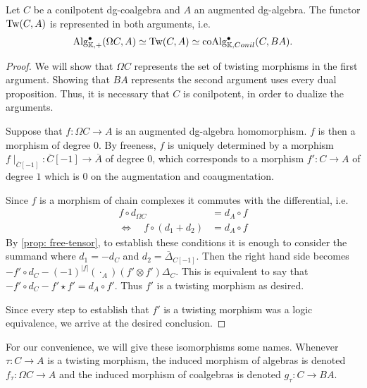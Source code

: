 \documentclass[../thesis.tex]{subfiles}
\begin{document}
            \begin{thm}\label{thm: cobar-bar-adj}
                Let $C$ be a conilpotent dg-coalgebra and $A$ an augmented dg-algebra. The functor $\tt{Tw}(C,A)$ is represented in both arguments, i.e.
                \begin{align*}
                    \tt{Alg}_{\mathbb{K},+}^\bullet(\Omega C, A)\simeq \tt{Tw}(C, A) \simeq \tt{coAlg}_{\mathbb{K},Conil}^\bullet(C, BA)\text{.}
                \end{align*}
            \end{thm}

            \begin{proof}
                We will show that $\Omega C$ represents the set of twisting morphisms in the first argument. Showing that $BA$ represents the second argument uses every dual proposition. Thus, it is necessary that $C$ is conilpotent, in order to dualize the arguments.

                Suppose that $f:\Omega C \rightarrow A$ is an augmented dg-algebra homomorphism. $f$ is then a morphism of degree $0$. By freeness, $f$ is uniquely determined by a morphism $f\mid_{\overline{C}[-1]}:\overline{C}[-1]\rightarrow \overline{A}$ of degree $0$, which corresponds to a morphism $f':C\rightarrow A$ of degree $1$ which is $0$ on the augmentation and coaugmentation. 

                Since $f$ is a morphism of chain complexes it commutes with the differential, i.e. 
                \begin{align*}
                    f\circ d_{\Omega C} & = d_A\circ f \\
                    \Leftrightarrow\quad f\circ (d_1 + d_2) & = d_A\circ f 
                \end{align*}
                By \ref{prop: free-tensor}, to establish these conditions it is enough to consider the summand where $d_1 = -d_C$ and $d_2 = \overline{\Delta}_{C[-1]}$. Then the right hand side becomes $-f' \circ d_C - (-1)^{|f|}(\cdot_A)(f' \otimes f')\Delta_C$. This is equivalent to say that $-f'\circ d_C - f'\star f' = d_A\circ f'$. Thus $f'$ is a twisting morphism as desired.

                Since every step to establish that $f'$ is a twisting morphism was a logic equivalence, we arrive at the desired conclusion.
            \end{proof}

            For our convenience, we will give these isomorphisms some names. Whenever $\tau : C \rightarrow A$ is a twisting morphism, the induced morphism of algebras is denoted $f_\tau : \Omega C \rightarrow A$ and the induced morphism of coalgebras is denoted $g_\tau : C \rightarrow BA$.
\end{document}
